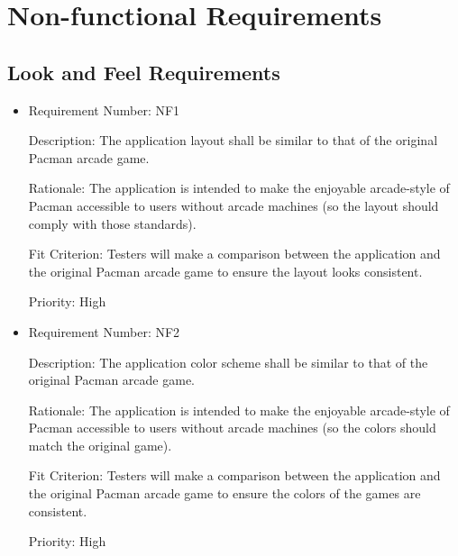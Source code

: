 \documentclass[12pt, titlepage]{article}
\begin{document}
\section{Non-functional Requirements}

\subsection{Look and Feel Requirements}
\begin{itemize}
	\item
	Requirement Number: NF1

	Description: The application layout shall be similar to that of the original Pacman arcade game.

	Rationale: The application is intended to make the enjoyable arcade-style of Pacman accessible to users without arcade machines (so the layout should comply with those standards).

	Fit Criterion: Testers will make a comparison between the application and the original Pacman arcade game to ensure the layout looks consistent.

	Priority: High

	\item
	Requirement Number: NF2

	Description: The application color scheme shall be similar to that of the original Pacman arcade game.

	Rationale: The application is intended to make the enjoyable arcade-style of Pacman accessible to users without arcade machines (so the colors should match the original game).

	Fit Criterion: Testers will make a comparison between the application and the original Pacman arcade game to ensure the colors of the games are consistent.

	Priority: High
\end{itemize}
\end{document}

